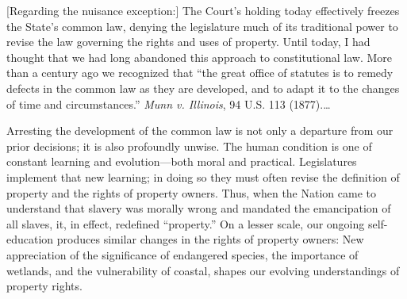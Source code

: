 %
%
%

[Regarding the nuisance exception:]
The Court's holding today effectively freezes the State's common law, denying
the legislature much of its traditional power to revise the law governing the
rights and uses of property. Until today, I had thought that we had long
abandoned this approach to constitutional law. More than a century ago we
recognized that ``the great office of statutes is to remedy defects in the
common law as they are developed, and to adapt it to the changes of time and
circumstances.'' \textit{Munn v. Illinois}, 94 U.S. 113 (1877).\ldots

Arresting the development of the common law is not only a departure from our
prior decisions; it is also profoundly unwise. The human condition is one of
constant learning and evolution---both moral and practical. Legislatures
implement that new learning; in doing so they must often revise the definition
of property and the rights of property owners. Thus, when the Nation came to
understand that slavery was morally wrong and mandated the emancipation of all
slaves, it, in effect, redefined ``property.'' On a lesser scale, our ongoing
self-education produces similar changes in the rights of property owners: New
appreciation of the significance of endangered species, the importance of
wetlands, and the vulnerability of coastal, shapes our evolving understandings
of property rights.

